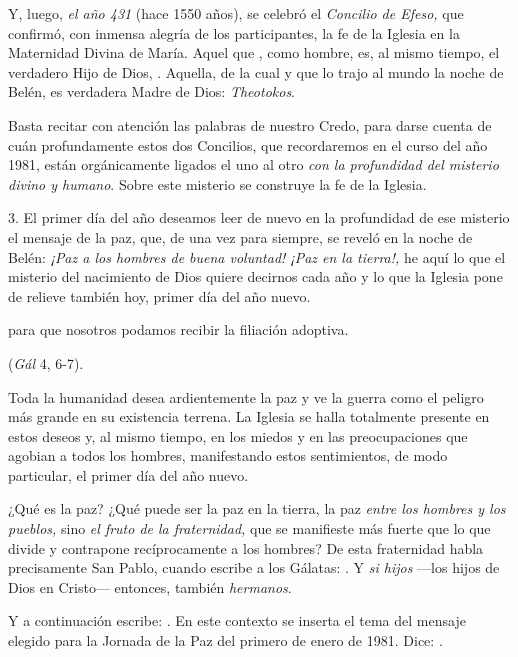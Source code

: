 \begin{body}
\begin{body}
Y, luego, \emph{el año 431} (hace 1550 años), se celebró el \emph{Concilio de Efeso,} que confirmó, con inmensa alegría de los participantes, la fe de la Iglesia en la Maternidad Divina de María. Aquel que , como hombre, es, al mismo tiempo, el verdadero Hijo de Dios, . Aquella, de la cual  y que lo trajo al mundo la noche de Belén, es verdadera Madre de Dios: \emph{Theotokos}.

Basta recitar con atención las palabras de nuestro Credo, para darse cuenta de cuán profundamente estos dos Concilios, que recordaremos en el curso del año 1981, están orgánicamente ligados el uno al otro \emph{con la profundidad del misterio divino y humano}. Sobre este misterio se construye la fe de la Iglesia.

3. El primer día del año deseamos leer de nuevo en la profundidad de ese misterio el mensaje de la paz, que, de una vez para siempre, se reveló en la noche de Belén: \emph{¡Paz a los hombres de buena voluntad! ¡Paz en la tierra!,} he aquí lo que el misterio del nacimiento de Dios quiere decirnos cada año y lo que la Iglesia pone de relieve también hoy, primer día del año nuevo.

 para que nosotros podamos recibir la filiación adoptiva.

 (\emph{Gál} 4, 6-7).

Toda la humanidad desea ardientemente la paz y ve la guerra como el peligro más grande en su existencia terrena. La Iglesia se halla totalmente presente en estos deseos y, al mismo tiempo, en los miedos y en las preocupaciones que agobian a todos los hombres, manifestando estos sentimientos, de modo particular, el primer día del año nuevo.

¿Qué es la paz? ¿Qué puede ser la paz en la tierra, la paz \emph{entre los hombres y los pueblos,} sino \emph{el fruto de la fraternidad,} que se manifieste más fuerte que lo que divide y contrapone recíprocamente a los hombres? De esta fraternidad habla precisamente San Pablo, cuando escribe a los Gálatas: . Y \emph{si hijos} ---los hijos de Dios en Cristo--- entonces, también \emph{hermanos}.

Y a continuación escribe: . En este contexto se inserta el tema del mensaje elegido para la Jornada de la Paz del primero de enero de 1981. Dice: \emph{}.


\end{body}
\end{body}
